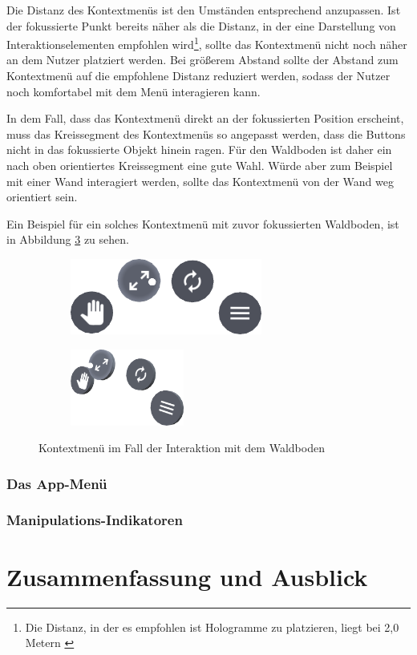 Die Distanz des Kontextmenüs ist den Umständen entsprechend anzupassen. Ist der fokussierte Punkt bereits näher als die Distanz, in der eine Darstellung von Interaktionselementen empfohlen wird\footnote{Die Distanz, in der es empfohlen ist Hologramme zu platzieren, liegt bei 2,0 Metern \cite{windows2017interaction}}, sollte das Kontextmenü nicht noch näher an dem Nutzer platziert werden. Bei größerem Abstand sollte der Abstand zum Kontextmenü auf die empfohlene Distanz reduziert werden, sodass der Nutzer noch komfortabel mit dem Menü interagieren kann.

In dem Fall, dass das Kontextmenü direkt an der fokussierten Position erscheint, muss das Kreissegment des Kontextmenüs so angepasst werden, dass die Buttons nicht in das fokussierte Objekt hinein ragen. Für den Waldboden ist daher ein nach oben orientiertes Kreissegment eine gute Wahl. Würde aber zum Beispiel mit einer Wand interagiert werden, sollte das Kontextmenü von der Wand weg orientiert sein.

Ein Beispiel für ein solches Kontextmenü mit zuvor fokussierten Waldboden, ist in Abbildung \ref{fig:context-menu} zu sehen.

\begin{figure}[htb]
  \centering
  \begin{subfigure}[b]{\fwidth}
    \centering
    \includegraphics[height=2.5cm]{figures/context-menu-front}
     \label{fig:context-menu-front}
  \end{subfigure}
  \begin{subfigure}[b]{\fwidth}
    \centering
  	\includegraphics[height=2.5cm]{figures/context-menu-side}
  	 \label{fig:context-menu-side}
  \end{subfigure}
  \caption{Kontextmenü im Fall der Interaktion mit dem Waldboden} \label{fig:context-menu}
\end{figure}



\subsection{Das App-Menü}

\subsection{Manipulations-Indikatoren}

\chapter{Zusammenfassung und Ausblick}
\label{ch:conclusion}
		